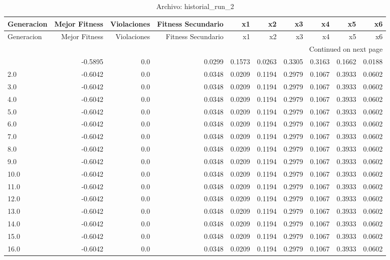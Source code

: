 \begin{longtable}{lrrrrrrrrr}
\caption{Archivo: historial\_run\_2}\label{tab:historial_run_2} \\
\toprule
Generacion & Mejor Fitness & Violaciones & Fitness Secundario & x1 & x2 & x3 & x4 & x5 & x6 \\
\midrule
\endfirsthead
\toprule
Generacion & Mejor Fitness & Violaciones & Fitness Secundario & x1 & x2 & x3 & x4 & x5 & x6 \\
\midrule
\endhead
\midrule
\multicolumn{10}{r}{Continued on next page} \\
\midrule
\endfoot
\bottomrule
\endlastfoot
1.0 & -0.5895 & 0.0 & 0.0299 & 0.1573 & 0.0263 & 0.3305 & 0.3163 & 0.1662 & 0.0188 \\
2.0 & -0.6042 & 0.0 & 0.0348 & 0.0209 & 0.1194 & 0.2979 & 0.1067 & 0.3933 & 0.0602 \\
3.0 & -0.6042 & 0.0 & 0.0348 & 0.0209 & 0.1194 & 0.2979 & 0.1067 & 0.3933 & 0.0602 \\
4.0 & -0.6042 & 0.0 & 0.0348 & 0.0209 & 0.1194 & 0.2979 & 0.1067 & 0.3933 & 0.0602 \\
5.0 & -0.6042 & 0.0 & 0.0348 & 0.0209 & 0.1194 & 0.2979 & 0.1067 & 0.3933 & 0.0602 \\
6.0 & -0.6042 & 0.0 & 0.0348 & 0.0209 & 0.1194 & 0.2979 & 0.1067 & 0.3933 & 0.0602 \\
7.0 & -0.6042 & 0.0 & 0.0348 & 0.0209 & 0.1194 & 0.2979 & 0.1067 & 0.3933 & 0.0602 \\
8.0 & -0.6042 & 0.0 & 0.0348 & 0.0209 & 0.1194 & 0.2979 & 0.1067 & 0.3933 & 0.0602 \\
9.0 & -0.6042 & 0.0 & 0.0348 & 0.0209 & 0.1194 & 0.2979 & 0.1067 & 0.3933 & 0.0602 \\
10.0 & -0.6042 & 0.0 & 0.0348 & 0.0209 & 0.1194 & 0.2979 & 0.1067 & 0.3933 & 0.0602 \\
11.0 & -0.6042 & 0.0 & 0.0348 & 0.0209 & 0.1194 & 0.2979 & 0.1067 & 0.3933 & 0.0602 \\
12.0 & -0.6042 & 0.0 & 0.0348 & 0.0209 & 0.1194 & 0.2979 & 0.1067 & 0.3933 & 0.0602 \\
13.0 & -0.6042 & 0.0 & 0.0348 & 0.0209 & 0.1194 & 0.2979 & 0.1067 & 0.3933 & 0.0602 \\
14.0 & -0.6042 & 0.0 & 0.0348 & 0.0209 & 0.1194 & 0.2979 & 0.1067 & 0.3933 & 0.0602 \\
15.0 & -0.6042 & 0.0 & 0.0348 & 0.0209 & 0.1194 & 0.2979 & 0.1067 & 0.3933 & 0.0602 \\
16.0 & -0.6042 & 0.0 & 0.0348 & 0.0209 & 0.1194 & 0.2979 & 0.1067 & 0.3933 & 0.0602 \\

\end{longtable}
